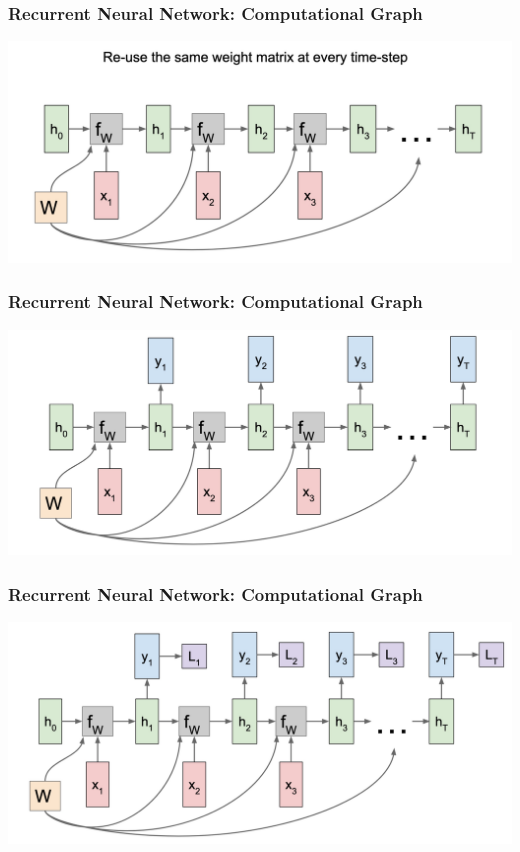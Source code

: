 \documentclass[aspectratio=1610]{beamer} %
\begin{document}
\begin{frame}

\frametitle{Recurrent Neural Network: Computational Graph}

\begin{center}
\includegraphics[width=\textwidth]{pics/rnngraph4}
\end{center}

\end{frame}

\begin{frame}

\frametitle{Recurrent Neural Network: Computational Graph}

\begin{center}
\includegraphics[width=\textwidth]{pics/rnngraph5}
\end{center}

\end{frame}

\begin{frame}

\frametitle{Recurrent Neural Network: Computational Graph}

\begin{center}
\includegraphics[width=\textwidth]{pics/rnngraph6}
\end{center}

\end{frame}
\end{document}
